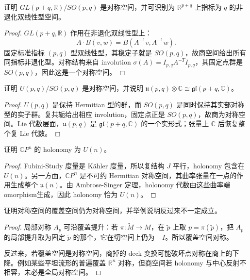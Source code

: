 \documentclass[11pt,a4paper,openany]{ctexbook}
\numberwithin{equation}{chapter}
\begin{document}
\begin{exercise}
证明 \(GL(p+q,\mathbb R)/SO(p,q)\) 是对称空间，并可识别为 \(\mathbb R^{p+q}\) 上指标为 \(q\) 的非退化双线性型空间。
\end{exercise}
\begin{proof}
\(GL(p+q,\mathbb R)\) 作用在非退化双线性型上：
\[
A\cdot B(v,w)=B(A^{-1}v,A^{-1}w).
\]
固定标准指标 \((p,q)\) 型双线性型，其稳定子就是 \(SO(p,q)\)，故商空间给出所有同指标非退化型。对称结构来自 involution \(\sigma(A)=I_{p,q}A^{-T}I_{p,q}\)，其固定点群是 \(SO(p,q)\)，因此这是一个对称空间。
\end{proof}

\begin{exercise}
证明 \(U(p,q)/SO(p,q)\) 是对称空间，并说明 \(\mathfrak u(p,q)\otimes\mathbb C\cong\mathfrak{gl}(p+q,\mathbb C)\)。
\end{exercise}
\begin{proof}
\(U(p,q)\) 是保持 Hermitian 型的群，而 \(SO(p,q)\) 是同时保持其实部对称型的实子群。复共轭给出相应 involution，固定点正是 \(SO(p,q)\)，故商为对称空间。Lie 代数层面，\(\mathfrak u(p,q)\) 是 \(\mathfrak{gl}(p+q,\mathbb C)\) 的一个实形式；张量上 \(\mathbb C\) 后恢复整个复 Lie 代数。
\end{proof}

\begin{exercise}
证明 \(\mathbb CP^n\) 的 holonomy 为 \(U(n)\)。
\end{exercise}
\begin{proof}
Fubini-Study 度量是 Kähler 度量，所以复结构 \(J\) 平行，holonomy 包含在 \(U(n)\)。另一方面，\(\mathbb CP^n\) 是不可约 Hermitian 对称空间，其曲率张量在一点的作用生成整个 \(\mathfrak u(n)\)。由 Ambrose-Singer 定理，holonomy 代数由这些曲率端omorphism生成，因此 holonomy 恰为 \(U(n)\)。
\end{proof}

\begin{exercise}
证明对称空间的覆盖空间仍为对称空间，并举例说明反过来不一定成立。
\end{exercise}
\begin{proof}
局部对称 \(A_p\) 可沿覆盖提升：若 \(\pi:\widetilde M\to M\)，在 \(\tilde p\) 上取 \(p=\pi(\tilde p)\)，把 \(A_p\) 的局部提升取为固定 \(\tilde p\) 的那个，它在切空间上仍为 \(-I\)。所以覆盖空间对称。

反过来，若覆盖空间是对称空间，商掉的 deck 变换可能破坏点对称在商上的下降。例如某些平坦流形的普遍覆盖 \(\mathbb R^n\) 对称，但商空间若 holonomy 与中心反射不相容，未必是全局对称空间。
\end{proof}
\end{document}
